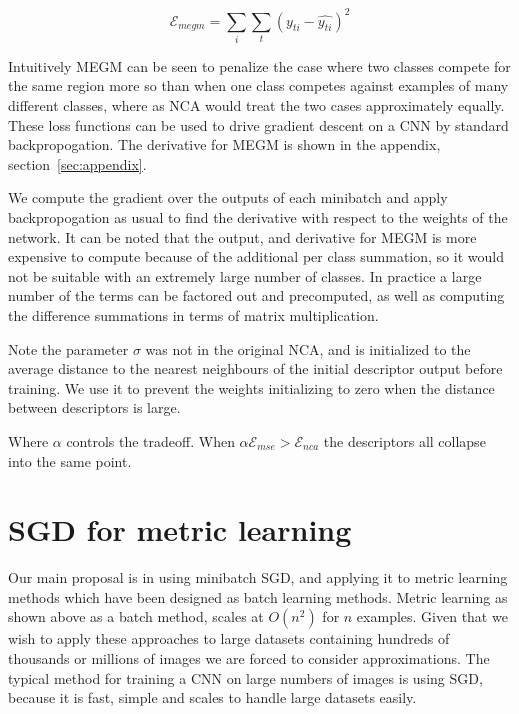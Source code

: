 \begin{equation}
\label{eq:megm_loss}
\mathcal{E}_{megm} =  \sum_i\sum_t{(y_{ti} - \hat{y_{ti}})^2}
\end{equation}

Intuitively \gls{MEGM} can be seen to penalize the case where two classes compete for the same region more so than when one class competes against examples of many different classes, where as \gls{NCA} would treat the two cases approximately equally. These loss functions can be used to drive gradient descent on a \gls{CNN} by standard backpropogation. The derivative for \gls{MEGM} is shown in the appendix, section~\ref{sec:appendix}.

We compute the gradient over the outputs of each minibatch and apply backpropogation as usual to find the derivative with respect to the weights of the network. It can be noted that the output, and derivative for \gls{MEGM} is more expensive to compute because of the additional per class summation, so it would not be suitable with an extremely large number of classes. In practice a large number of the terms can be factored out and precomputed, as well as computing the difference summations in terms of matrix multiplication.

Note the parameter $ \sigma $ was not in the original NCA, and is initialized to the average distance to the nearest neighbours of the initial descriptor output before training. We use it to prevent the weights initializing to zero when the distance between descriptors is large.


Where $\alpha $ controls the tradeoff. When $ \alpha \mathcal{E}_{mse} > \mathcal{E}_{nca} $ the descriptors all collapse into the same point.


\section{SGD for metric learning}

Our main proposal is in using minibatch \gls{SGD}, and applying it to metric learning methods which have been designed as batch learning methods. Metric learning as shown above as a batch method, scales at $ O(n^2) $ for $ n $ examples. Given that we wish to apply these approaches to large datasets containing hundreds of thousands or millions of images we are forced to consider approximations. The typical method for training a \gls{CNN} on large numbers of images is using \gls{SGD}, because it is fast, simple and scales to handle large datasets easily. 

